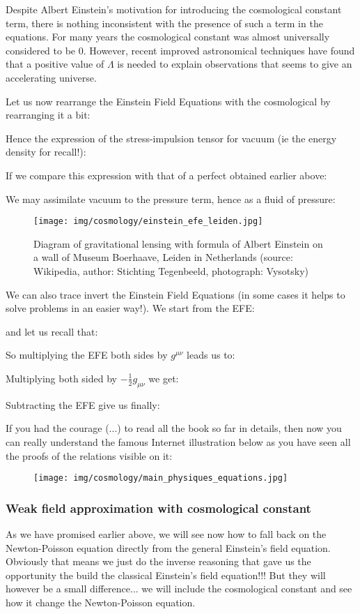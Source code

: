 		Despite Albert Einstein's motivation for introducing the cosmological constant term, there is nothing inconsistent with the presence of such a term in the equations. For many years the cosmological constant was almost universally considered to be $0$. However, recent improved astronomical techniques have found that a positive value of $\Lambda$  is needed to explain observations that seems to give an accelerating universe.	
		
	Let us now rearrange the Einstein Field Equations with the cosmological by rearranging it a bit:
	
	Hence the expression of the stress-impulsion tensor for vacuum (ie the energy density for recall!):
	
	If we compare this expression with that of a perfect obtained earlier above:
	
	We may assimilate vacuum to the pressure term, hence as a fluid of pressure:
	
	\begin{figure}[H]
		\centering
		\texttt{[image: img/cosmology/einstein\_efe\_leiden.jpg]}	
		\caption[]{Diagram of gravitational lensing with formula of Albert Einstein on a wall of Museum Boerhaave, Leiden in Netherlands (source: Wikipedia, author: Stichting Tegenbeeld,  photograph: Vysotsky)}
	\end{figure}
	We can also trace invert the Einstein Field Equations (in some cases it helps to solve problems in an easier way!). We start from the EFE:
	
	and let us recall that:
	
	So multiplying the EFE both sides by $g^{\mu\nu}$ leads us to:
	
	Multiplying both sided by $-\frac{1}{2}g_{\mu\nu}$ we get:
	
	Subtracting the EFE give us finally:
	
	If you had the courage (...) to read all the book so far in details, then now you can  really understand the famous Internet illustration below as you have seen all the proofs of the relations visible on it:
	\begin{figure}[H]
		\centering
		\texttt{[image: img/cosmology/main\_physiques\_equations.jpg]}	
	\end{figure}
	
	\subsubsection{Weak field approximation with cosmological constant}\label{weak field approximation}
	As we have promised earlier above, we will see now how to fall back on the Newton-Poisson equation directly from the general Einstein's field equation. Obviously that means we just do the inverse reasoning that gave us the opportunity the build the classical Einstein's field equation!!! But they will however be a small difference... we will include the cosmological constant and see how it change the Newton-Poisson equation.
	
